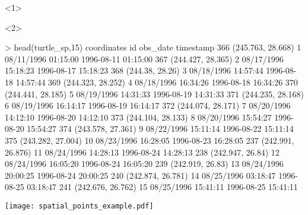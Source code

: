 \begin{frame}[t,fragile]{\subsecname}{\subsubsecname}
\begin{overlayarea}{\textwidth}{\textheight}
\begin{onlyenv}<1>
\begin{minipage}{\textwidth}
\end{minipage}
\end{onlyenv}

\begin{onlyenv}<2>
\begin{minipage}{\textwidth}
\begin{rcode}
> head(turtle_sp,15)
          coordinates id            obs_date           timestamp
366 (245.763, 28.668)  1 08/11/1996 01:15:00 1996-08-11 01:15:00
367 (244.427, 28.365)  2 08/17/1996 15:18:23 1996-08-17 15:18:23
368   (244.38, 28.26)  3 08/18/1996 14:57:44 1996-08-18 14:57:44
369 (244.323, 28.252)  4 08/18/1996 16:34:26 1996-08-18 16:34:26
370 (244.441, 28.185)  5 08/19/1996 14:31:33 1996-08-19 14:31:33
371 (244.235, 28.168)  6 08/19/1996 16:14:17 1996-08-19 16:14:17
372 (244.074, 28.171)  7 08/20/1996 14:12:10 1996-08-20 14:12:10
373 (244.104, 28.133)  8 08/20/1996 15:54:27 1996-08-20 15:54:27
374 (243.578, 27.361)  9 08/22/1996 15:11:14 1996-08-22 15:11:14
375 (243.282, 27.004) 10 08/23/1996 16:28:05 1996-08-23 16:28:05
237 (242.991, 26.876) 11 08/24/1996 14:28:13 1996-08-24 14:28:13
238  (242.947, 26.84) 12 08/24/1996 16:05:20 1996-08-24 16:05:20
239  (242.919, 26.83) 13 08/24/1996 20:00:25 1996-08-24 20:00:25
240 (242.874, 26.781) 14 08/25/1996 03:18:47 1996-08-25 03:18:47
241 (242.676, 26.762) 15 08/25/1996 15:41:11 1996-08-25 15:41:11
\end{rcode}
\end{minipage}
\end{onlyenv}

\begin{minipage}{\textwidth}
\centering
\texttt{[image: spatial\_points\_example.pdf]}
\end{minipage}
\end{overlayarea}
\end{frame}

